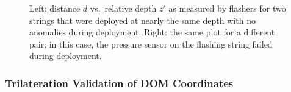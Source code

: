 \begin{figure}[!ht]
  \captionsetup[subfigure]{labelformat=empty} \centering
  \caption{Left: distance $d$ vs.~relative depth $z'$ as measured by flashers for
    two strings that were deployed at nearly the same depth with no
    anomalies during deployment. Right: the same plot for a different pair;
    in this case, the pressure sensor on the flashing string failed during
    deployment.}
  \label{fig:geohyperbola}
\end{figure}


\subsubsection{\label{sec:trilateration}Trilateration Validation of DOM Coordinates}

